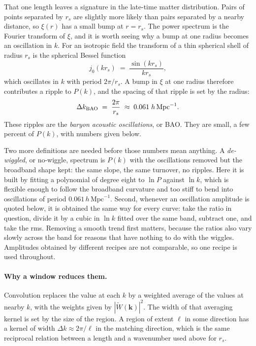 \documentclass[12pt]{article}
\newcommand{\bk}{\mathbf{k}}
\begin{document}
That one length leaves a signature in the late-time matter distribution.
Pairs of points separated by $r_s$ are slightly more likely than pairs
separated by a nearby distance, so $\xi(r)$ has a small bump at
$r = r_s$.  The power spectrum is the Fourier transform of $\xi$, and it is
worth seeing why a bump at one radius becomes an oscillation in $k$.  For
an isotropic field the transform of a thin spherical shell of radius $r_s$
is the spherical Bessel function
\begin{equation}
  j_0(k r_s) \;=\; \frac{\sin (k r_s)}{k r_s},
\end{equation}
which oscillates in $k$ with period $2\pi/r_s$.  A bump in $\xi$ at one
radius therefore contributes a ripple to $P(k)$, and the spacing of that
ripple is set by the radius:
\begin{equation}
  \Delta k_{\rm BAO} \;=\; \frac{2\pi}{r_s}
  \;\approx\; 0.061 \; h\,\mathrm{Mpc}^{-1} .
\end{equation}
These ripples are the \emph{baryon acoustic oscillations}, or BAO.  They
are small, a few percent of $P(k)$, with numbers given below.

Two more definitions are needed before those numbers mean anything.  A
\emph{de-wiggled}, or no-wiggle, spectrum is $P(k)$ with the oscillations
removed but the broadband shape kept: the same slope, the same turnover, no
ripples.  Here it is built by fitting a polynomial of degree eight to
$\ln P$ against $\ln k$, which is flexible enough to follow the broadband
curvature and too stiff to bend into oscillations of period
$0.061\,h\,\mathrm{Mpc}^{-1}$.  Second, whenever an oscillation amplitude
is quoted below, it is obtained the same way for every curve: take the
ratio in question, divide it by a cubic in $\ln k$ fitted over the same
band, subtract one, and take the rms.  Removing a smooth trend first
matters, because the ratios also vary slowly across the band for reasons
that have nothing to do with the wiggles.  Amplitudes obtained by different
recipes are not comparable, so one recipe is used throughout.

\paragraph{Why a window reduces them.}
Convolution replaces the value at each $k$ by a weighted average of the
values at nearby $k$, with the weights given by $|\widetilde W(\bk)|^2$.
The width of that averaging kernel is set by the size of the region.  A
region of extent $\ell$ in some direction has a kernel of width
$\Delta k \approx 2\pi/\ell$ in the matching direction, which is the same
reciprocal relation between a length and a wavenumber used above for
$r_s$.
\end{document}
